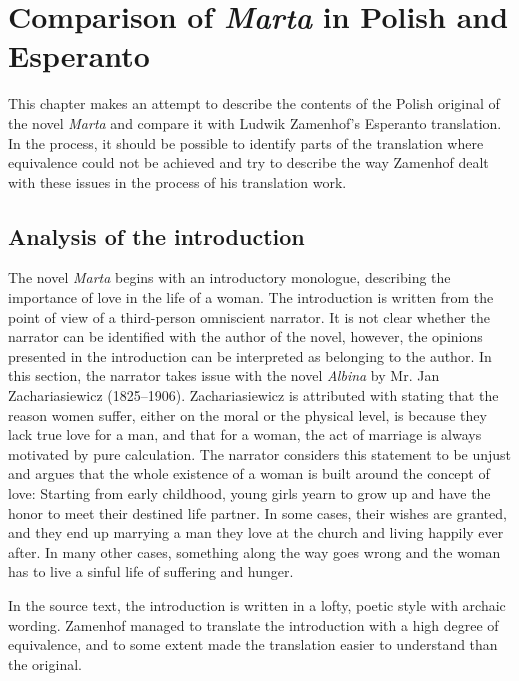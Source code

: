 \chapter{Comparison of \textit{Marta} in Polish and Esperanto}

This chapter makes an attempt to describe the contents of the Polish original of the novel \textit{Marta} and compare it with Ludwik Zamenhof's Esperanto translation.
In the process, it should be possible to identify parts of the translation where equivalence could not be achieved and try to describe the way Zamenhof dealt with these issues in the process of his translation work.

\section{Analysis of the introduction}

The novel \textit{Marta} begins with an introductory monologue, describing the importance of love in the life of a woman.
The introduction is written from the point of view of a third-person omniscient narrator.
It is not clear whether the narrator can be identified with the author of the novel, however, the opinions presented in the introduction can be interpreted as belonging to the author.
In this section, the narrator takes issue with the novel \textit{Albina} by Mr. Jan Zachariasiewicz (1825--1906).
Zachariasiewicz is attributed with stating that the reason women suffer, either on the moral or the physical level, is because they lack true love for a man, and that for a woman, the act of marriage is always motivated by pure calculation.
The narrator considers this statement to be unjust and argues that the whole existence of a woman is built around the concept of love:
Starting from early childhood, young girls yearn to grow up and have the honor to meet their destined life partner.
In some cases, their wishes are granted, and they end up marrying a man they love at the church and living happily ever after.
In many other cases, something along the way goes wrong and the woman has to live a sinful life of suffering and hunger.

In the source text, the introduction is written in a lofty, poetic style with archaic wording.
Zamenhof managed to translate the introduction with a high degree of equivalence, and to some extent made the translation easier to understand than the original.


